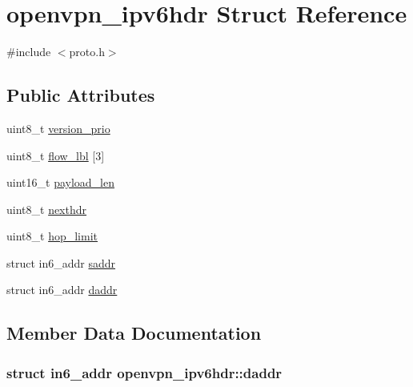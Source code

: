 \hypertarget{structopenvpn__ipv6hdr}{}\section{openvpn\+\_\+ipv6hdr Struct Reference}
\label{structopenvpn__ipv6hdr}


{\ttfamily \#include $<$proto.\+h$>$}

\subsection*{Public Attributes}
\begin{DoxyCompactItemize}
\item 
uint8\+\_\+t \hyperlink{structopenvpn__ipv6hdr_a0da30a8309dca7c55db02fa08029733b}{version\+\_\+prio}
\item 
uint8\+\_\+t \hyperlink{structopenvpn__ipv6hdr_ab04ad57dda91376a2dce8d84f198ab30}{flow\+\_\+lbl} \mbox{[}3\mbox{]}
\item 
uint16\+\_\+t \hyperlink{structopenvpn__ipv6hdr_ad62a83ebef30cb69d87722ea35c3d5f1}{payload\+\_\+len}
\item 
uint8\+\_\+t \hyperlink{structopenvpn__ipv6hdr_abd06674df4275475eb9226969a29f1e0}{nexthdr}
\item 
uint8\+\_\+t \hyperlink{structopenvpn__ipv6hdr_a4cbe82913aa2e9cca60bf2b37efdfdec}{hop\+\_\+limit}
\item 
struct in6\+\_\+addr \hyperlink{structopenvpn__ipv6hdr_a6dd3e61a3a45a75c7c719c2711a220e5}{saddr}
\item 
struct in6\+\_\+addr \hyperlink{structopenvpn__ipv6hdr_a81d91cdd7be6d27e58d5fde163e7aff6}{daddr}
\end{DoxyCompactItemize}


\subsection{Member Data Documentation}
\hypertarget{structopenvpn__ipv6hdr_a81d91cdd7be6d27e58d5fde163e7aff6}{}
\subsubsection[{daddr}]{\setlength{\rightskip}{0pt plus 5cm}struct in6\+\_\+addr openvpn\+\_\+ipv6hdr\+::daddr}\label{structopenvpn__ipv6hdr_a81d91cdd7be6d27e58d5fde163e7aff6}
\hypertarget{structopenvpn__ipv6hdr_ab04ad57dda91376a2dce8d84f198ab30}{}
